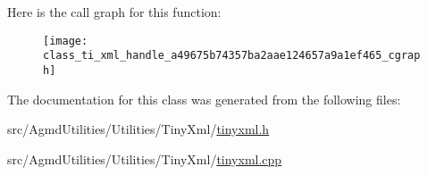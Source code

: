 Here is the call graph for this function\+:\nopagebreak
\begin{figure}[H]
\begin{center}
\leavevmode
\texttt{[image: class\_ti\_xml\_handle\_a49675b74357ba2aae124657a9a1ef465\_cgraph]}
\end{center}
\end{figure}




The documentation for this class was generated from the following files\+:\begin{DoxyCompactItemize}
\item 
src/\+Agmd\+Utilities/\+Utilities/\+Tiny\+Xml/\hyperlink{tinyxml_8h}{tinyxml.\+h}\item 
src/\+Agmd\+Utilities/\+Utilities/\+Tiny\+Xml/\hyperlink{tinyxml_8cpp}{tinyxml.\+cpp}\end{DoxyCompactItemize}
